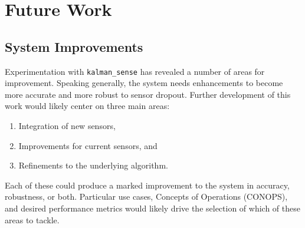 \chapter{Future Work}

\section{System Improvements}

Experimentation with \texttt{kalman\_sense} has revealed a number of areas for improvement. Speaking generally, the system needs enhancements to become more accurate and more robust to sensor dropout. Further development of this work would likely center on three main areas:
\begin{enumerate}
    \item Integration of new sensors,
    \item Improvements for current sensors, and
    \item Refinements to the underlying algorithm.
\end{enumerate}
Each of these could produce a marked improvement to the system in accuracy, robustness, or both. Particular use cases, Concepts of Operations (CONOPS), and desired performance metrics would likely drive the selection of which of these areas to tackle.

